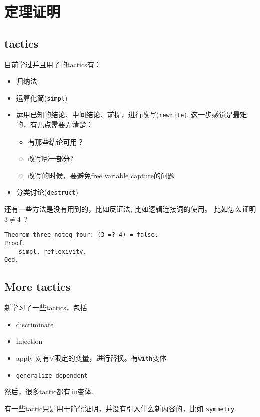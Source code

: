 \documentclass{book}
\begin{document}
\tableofcontents
\chapter{定理证明}
\section{tactics}
目前学过并且用了的tactics有：
\begin{itemize}
    \item 归纳法
    \item 运算化简(\verb|simpl|)
    \item 运用已知的结论、中间结论、前提，进行改写(\verb|rewrite|).
        这一步感觉是最难的，有几点需要弄清楚：
        \begin{itemize}
            \item 有那些结论可用？
            \item 改写哪一部分?
            \item 改写的时候，要避免free variable capture的问题
        \end{itemize}
    \item 分类讨论(\verb|destruct|)
\end{itemize}

还有一些方法是没有用到的，比如反证法, 比如逻辑连接词的使用。
比如怎么证明 $ 3 \ne 4 $\ ?
\begin{lstlisting}[language=Coq]
Theorem three_noteq_four: (3 =? 4) = false.
Proof.
    simpl. reflexivity.
Qed.
\end{lstlisting}

\section{More tactics}
新学习了一些tactics，包括
\begin{itemize}
    \item discriminate
    \item injection
    \item apply \qquad 对有$\forall$限定的变量，进行替换。有\verb|with|变体
    \item \lstinline{generalize dependent}
\end{itemize}
然后，很多tactic都有\verb|in|变体.

有一些tactic只是用于简化证明，并没有引入什么新内容的，比如 \verb|symmetry|.
\end{document}
